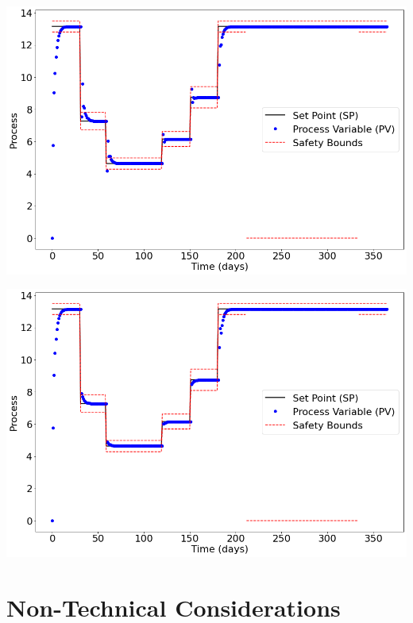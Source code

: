 \documentclass{article}
\begin{document}
\begin{multicols*}{2}
        \vspace{5mm}
        \noindent
        \begin{minipage}{0.49\textwidth}
            \includegraphics[width=\textwidth]{projectPID_untuned.png}
        \end{minipage}

        \noindent
        \begin{minipage}{0.49\textwidth}
            \includegraphics[width=\textwidth]{projectPID_tuned.png}
        \end{minipage}

        \section{Non-Technical Considerations}


\end{multicols*}
\end{document}
